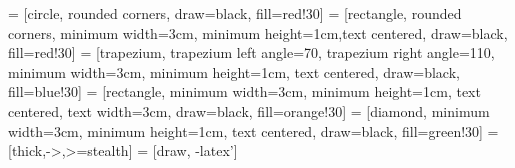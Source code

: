 \usepackage{tikz}
\usetikzlibrary{graphs,shapes.geometric, positioning,arrows,calc}

 = [circle, rounded corners, draw=black, fill=red!30]
 = [rectangle, rounded corners, minimum width=3cm, minimum height=1cm,text centered, draw=black, fill=red!30]
 = [trapezium, trapezium left angle=70, trapezium right angle=110, minimum width=3cm, minimum height=1cm, text centered, draw=black, fill=blue!30]
 = [rectangle, minimum width=3cm, minimum height=1cm, text centered, text width=3cm, draw=black, fill=orange!30]
 = [diamond, minimum width=3cm, minimum height=1cm, text centered, draw=black, fill=green!30]
 = [thick,->,>=stealth]
 = [draw, -latex']
